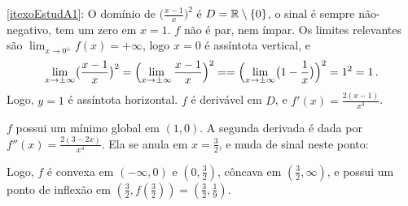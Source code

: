 \begin{Solution}{8.6}
\eqref{itexoEstudA1}:
O domínio de $\bigl(\frac{x-1}{x}\bigr)^2$ é $D=\mathbb{R}\setminus \{0\}$, o sinal é
sempre não-negativo, tem um zero
em $x=1$. $f$ não é par, nem ímpar.
Os limites relevantes são $\lim_{x\to 0^{\pm}}f(x)=+\infty$, logo $x=0$ é
assíntota vertical, e
$$\lim_{x\to \pm\infty}\bigl(\frac{x-1}{x}\bigr)^2=\Bigl(\lim_{x\to \pm
\infty}\frac{x-1}{x}\Bigr)^2==\Bigl(\lim_{x\to \pm
\infty}\bigl(1-\frac{1}{x}\bigr)\Bigr)^2=1^2=1\,.$$
Logo, $y=1$ é assíntota horizontal.
$f$ é derivável em $D$, e $f'(x)=\frac{2(x-1)}{x^3}$.
\begin{center}
\begin{bmlimage}\end{bmlimage}
\end{center}
$f$ possui um mínimo global em $(1,0)$.
A segunda derivada é dada por $f''(x)=\frac{2(3-2x)}{x^4}$. Ela se anula em
$x=\tfrac32$, e muda de sinal neste ponto:
\begin{center}
\begin{bmlimage}\end{bmlimage}
\end{center}
Logo, $f$ é convexa em $(-\infty,0)$ e $(0,\frac32)$,  côncava em
$(\frac32,\infty)$, e possui um ponto de inflexão em
$(\tfrac{3}{2},f(\tfrac{3}{2}))=(\tfrac{3}{2},\tfrac19)$.
\begin{center}
\begin{bmlimage}
\end{bmlimage}
\end{center}
\end{Solution}
